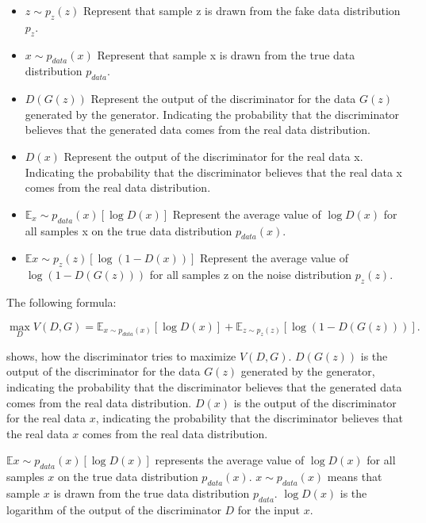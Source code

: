 \begin{itemize}
    \item \textbf{ $z \sim p_{z}(z)$} Represent that sample z is drawn from the fake data distribution $p_{z}$.
    \item \textbf{ $x \sim p_{data}(x)$} Represent that sample x is drawn from the true data distribution $p_{data}$.
    \item \textbf{ $D(G(z))$} Represent the output of the discriminator for the data $G(z)$ generated by 
    the generator. Indicating the probability that the discriminator believes that the generated 
    data comes from the real data distribution.
    \item \textbf{$D(x)$} Represent the output of the discriminator for the real data x. Indicating the probability that 
    the discriminator believes that the real data x comes from the real data distribution.
    \item \textbf{$\mathbb{E}{_x \sim p_{data}(x)}[\log D(x)]$} Represent the average value of $\log D(x)$ 
    for all samples x on the true data distribution $p_{data}(x)$.
    \item \textbf{$\mathbb{E}{x \sim p_{z}(z)}[\log (1 - D(x))]$} Represent the average value of $\log (1 - D(G(z)))$ 
    for all samples z on the noise distribution $p_z(z)$.
\end{itemize}


The following formula:

\begin{equation}
    \label{eq:max}
    \max_{D} V(D, G) = \mathbb{E}_{x \sim p_{data}(x)} [\log D(x)] + \mathbb{E}_{z \sim p_{z}(z)} [\log(1 - D(G(z)))].
\end{equation}

shows, how the discriminator tries to maximize $V(D, G)$. $D(G(z))$ is the output of the discriminator for the data $G(z)$ generated by the generator, 
indicating the probability that the discriminator believes that the generated data comes from the real data distribution.
$D(x)$ is the output of the discriminator for the real data $x$, 
indicating the probability that the discriminator believes that the real data $x$ comes from the real data distribution.

$\mathbb{E}{x \sim p_{data}(x)}[\log D(x)]$ represents the average value of $\log D(x)$ for all samples $x$ on the true data distribution $p_{data}(x)$.
$x \sim p_{data}(x)$ means that sample $x$ is drawn from the true data distribution $p_{data}$.
$\log D(x)$ is the logarithm of the output of the discriminator $D$ for the input $x$.





